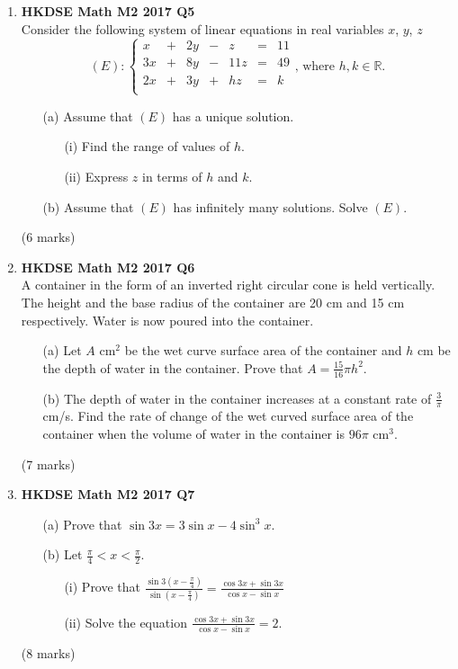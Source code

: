 \documentclass[12pt]{article}
\begin{document}
\begin{enumerate}
	\item \textbf{HKDSE Math M2 2017 Q5}\\
	Consider the following system of linear equations in real variables $x$, $y$, $z$
		$$(E) : \left\{\begin{matrix}
		x&  +&2y&  -&z& = &11  \\
		3x& +&8y&  -&11z& = & 49 \\
		2x& +&3y&  +&hz& = & k \\
		\end{matrix}\right.\text{, where } h,k \in \mathbb{R}.$$ 
	\begin{enumerate}
		\item [(a)] Assume that $(E)$ has a unique solution.
		\begin{enumerate}
			\item [(i)]Find the range of values of $h$.
			\item [(ii)]Express $z$ in terms of $h$ and $k$.
		\end{enumerate}
		\item [(b)]Assume that $(E)$ has infinitely many solutions. Solve $(E)$.
	\end{enumerate}
	(6 marks)


	\item \textbf{HKDSE Math M2 2017 Q6}\\
	A container in the form of an inverted right circular cone is held vertically. The height and the base radius of the container are 20 cm and 15 cm respectively. Water is now poured into the container.
	\begin{enumerate}
		\item [(a)]Let $A$ cm$^2$ be the wet curve surface area of the container and $h$ cm be the depth of water in the container. Prove that $\displaystyle A = \frac{15}{16}\pi h^2$. 
		\item [(b)]The depth of water in the container increases at a constant rate of $\displaystyle\frac{3}{\pi}$ cm/s. Find the rate of change of the wet curved surface area of the container when the volume of water in the container is $96 \pi$ cm$^3$.
	\end{enumerate}
	(7 marks)

	\item\textbf{HKDSE Math M2 2017 Q7}
	\begin{enumerate}
		\item[(a)]Prove that $\sin{3x} = 3\sin{x}  - 4\sin^3{x}$. 
		\item[(b)]Let $\displaystyle\frac{\pi}{4} < x < \frac{\pi}{2}$.
		\begin{enumerate}
			\item [(i)]Prove that $\displaystyle\frac{\sin{3\left(x - \displaystyle\frac{\pi}{4}\right)}}{\sin{\left(x - \displaystyle\frac{\pi}{4}\right)}} = \frac{\cos{3x} + \sin{3x}}{\cos{x} - \sin{x}}$
			\item [(ii)]Solve the equation $\displaystyle\frac{\cos{3x} + \sin{3x}}{\cos{x} - \sin{x}} = 2$.
		\end{enumerate}
	\end{enumerate}
	(8 marks)


\end{enumerate}
\end{document}
